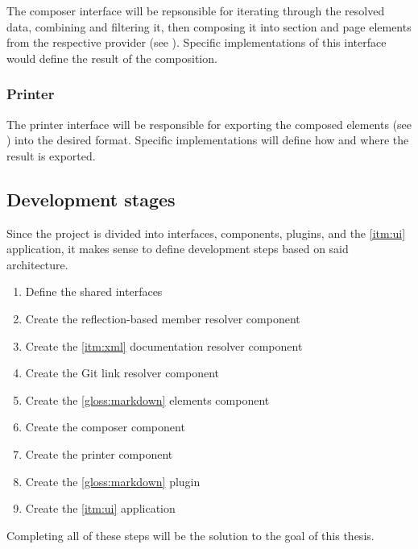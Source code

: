 The composer interface will be repsonsible for iterating through the resolved data, combining and filtering it, then composing it into section and page elements from the respective provider (see ).
Specific implementations of this interface would define the result of the composition.

\subsubsection{Printer}

The printer interface will be responsible for exporting the composed elements (see ) into the desired format.
Specific implementations will define how and where the result is exported.

\subsection{Development stages}

Since the project is divided into interfaces, components, plugins, and the \ref{itm:ui} application, it makes sense to define development steps based on said architecture.

\begin{enumerate}
    \item Define the shared interfaces
    \item Create the reflection-based member resolver component
    \item Create the \ref{itm:xml} documentation resolver component
    \item Create the Git link resolver component
    \item Create the \ref{gloss:markdown} elements component
    \item Create the composer component
    \item Create the printer component
    \item Create the \ref{gloss:markdown} plugin
    \item Create the \ref{itm:ui} application
\end{enumerate}

Completing all of these steps will be the solution to the goal of this thesis.